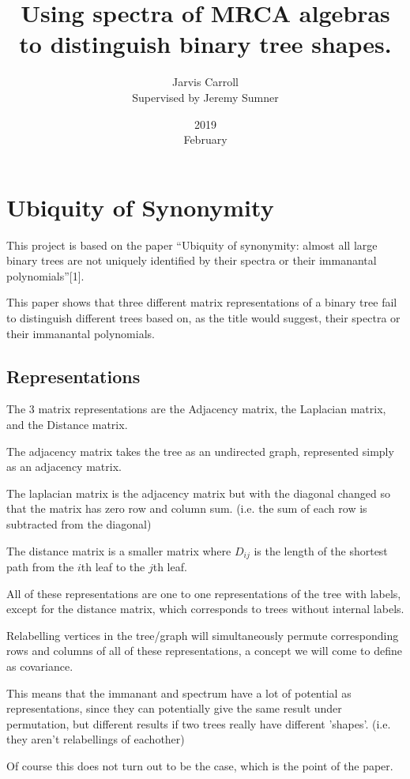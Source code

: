 \documentclass[10pt,a4paper]{report}
\title{Using spectra of MRCA algebras to distinguish binary tree shapes.}
\date{2019\\ February}
\author{Jarvis Carroll
\\ Supervised by Jeremy Sumner}
\begin{document}
\maketitle

\chapter{Ubiquity of Synonymity}

This project is based on the paper ``Ubiquity of synonymity: almost all large
binary trees are not uniquely identified by their spectra or their immanantal
polynomials''[1].

This paper shows that three different matrix representations of a binary tree
fail to distinguish different trees based on, as the title would suggest, their
spectra or their immanantal polynomials.

\section{Representations}

The 3 matrix representations are the Adjacency matrix, the Laplacian matrix,
and the Distance matrix.

The adjacency matrix takes the tree as an undirected graph, represented simply
as an adjacency matrix.

The laplacian matrix is the adjacency matrix but with the diagonal changed so
that the matrix has zero row and column sum. (i.e. the sum of each row is
subtracted from the diagonal)

The distance matrix is a smaller matrix where $D_{ij}$ is the length of the
shortest path from the $i$th leaf to the $j$th leaf.

All of these representations are one to one representations of the tree with
labels, except for the distance matrix, which corresponds to trees without
internal labels.

Relabelling vertices in the tree/graph will simultaneously permute
corresponding rows and columns of all of these representations, a concept we
will come to define as covariance.

This means that the immanant and spectrum have a lot of potential as
representations, since they can potentially give the same result under
permutation, but different results if two trees really have different 'shapes'.
(i.e. they aren't relabellings of eachother)

Of course this does not turn out to be the case, which is the point of the
paper.
\end{document}
